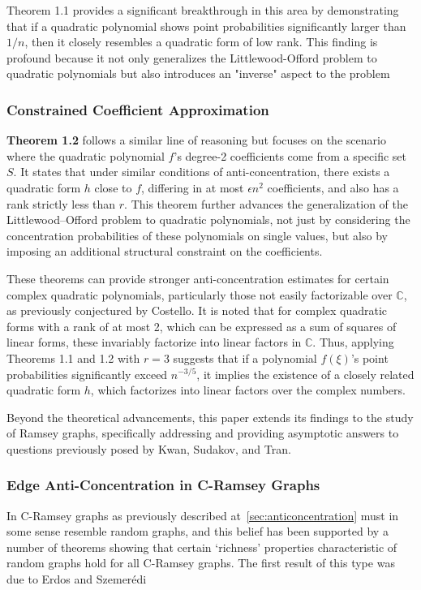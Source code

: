 Theorem 1.1 provides a significant breakthrough in this 
area by demonstrating that if a quadratic polynomial shows 
point probabilities significantly larger than $1/n$, then
it closely resembles a quadratic form of low rank.
This finding is profound because it not only generalizes
the Littlewood-Offord problem to quadratic polynomials
but also introduces an "inverse" aspect to the problem

\subsubsection{Constrained Coefficient Approximation}
\textbf{Theorem 1.2} follows a similar line of reasoning but
focuses on the scenario where the quadratic polynomial ${f}$'s 
degree-2 coefficients come from a specific set $S$. 
It states that under similar conditions of anti-concentration,
there exists a quadratic form $h$ close to ${f}$,
differing in at most $\epsilon n^2$ coefficients, 
and also has a rank strictly less than $r$. 
This theorem further advances the generalization of the 
Littlewood–Offord problem to quadratic polynomials,
not just by considering the concentration probabilities
of these polynomials on single values, but also by imposing
an additional structural constraint on the coefficients.

These theorems can provide stronger anti-concentration
estimates for certain complex quadratic polynomials,
particularly those not easily factorizable over $\mathbb{C}$,
as previously conjectured by Costello.
It is noted that for complex quadratic forms with a rank
of at most 2, which can be expressed as a sum of squares 
of linear forms, these invariably factorize into linear factors
in $\mathbb{C}$.
Thus, applying Theorems 1.1 and 1.2 with $r = 3$ suggests
that if a polynomial $f(\xi)$'s point probabilities
significantly exceed $n^{-3/5}$, it implies the existence 
of a closely related quadratic form $h$, which factorizes
into linear factors over the complex numbers.

Beyond the theoretical advancements, this paper extends
its findings to the study of Ramsey graphs,
specifically addressing and providing asymptotic 
answers to questions previously posed by Kwan, Sudakov, and Tran.

\subsubsection{Edge Anti-Concentration in C-Ramsey Graphs}
In C-Ramsey graphs as previously described at~\ref{sec:anticoncentration}
must in some sense resemble random graphs,
and this belief has been supported by a number of theorems
showing that certain `richness' properties
characteristic of random graphs hold for all C-Ramsey graphs.
The first result of this type was due
to Erdos and Szemerédi~\cite{erdHos1972ramsey}

